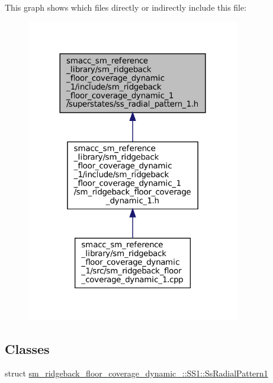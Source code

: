 This graph shows which files directly or indirectly include this file\+:
\nopagebreak
\begin{figure}[H]
\begin{center}
\leavevmode
\includegraphics[width=264pt]{sm__ridgeback__floor__coverage__dynamic__1_2include_2sm__ridgeback__floor__coverage__dynamic__1_e1964fa2fe6fd86d607bfc83c2ea818c}
\end{center}
\end{figure}
\subsection*{Classes}
\begin{DoxyCompactItemize}
\item 
struct \hyperlink{structsm__ridgeback__floor__coverage__dynamic__1_1_1SS1_1_1SsRadialPattern1}{sm\+\_\+ridgeback\+\_\+floor\+\_\+coverage\+\_\+dynamic\+\_\+::\+S\+S1\+::\+Ss\+Radial\+Pattern1}
\end{DoxyCompactItemize}
